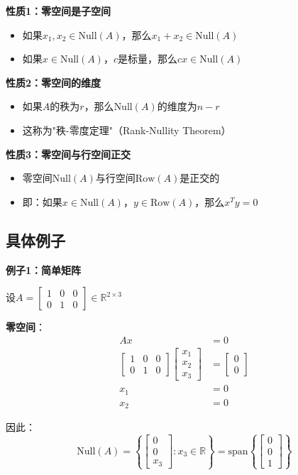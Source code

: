 \documentclass[12pt,a4paper]{article}
\begin{document}
\textbf{性质1：零空间是子空间}
\begin{itemize}
\item 如果$x_1, x_2 \in \text{Null}(A)$，那么$x_1 + x_2 \in \text{Null}(A)$
\item 如果$x \in \text{Null}(A)$，$c$是标量，那么$cx \in \text{Null}(A)$
\end{itemize}

\textbf{性质2：零空间的维度}
\begin{itemize}
\item 如果$A$的秩为$r$，那么$\text{Null}(A)$的维度为$n - r$
\item 这称为"秩-零度定理"（Rank-Nullity Theorem）
\end{itemize}

\textbf{性质3：零空间与行空间正交}
\begin{itemize}
\item 零空间$\text{Null}(A)$与行空间$\text{Row}(A)$是正交的
\item 即：如果$x \in \text{Null}(A)$，$y \in \text{Row}(A)$，那么$x^T y = 0$
\end{itemize}

\subsection{具体例子}

\textbf{例子1：简单矩阵}

设$A = \begin{bmatrix} 1 & 0 & 0 \\ 0 & 1 & 0 \end{bmatrix} \in \mathbb{R}^{2 \times 3}$

\textbf{零空间}：
\begin{align}
Ax &= 0 \\
\begin{bmatrix} 1 & 0 & 0 \\ 0 & 1 & 0 \end{bmatrix} \begin{bmatrix} x_1 \\ x_2 \\ x_3 \end{bmatrix} &= \begin{bmatrix} 0 \\ 0 \end{bmatrix} \\
x_1 &= 0 \\
x_2 &= 0
\end{align}

因此：
\begin{equation}
\text{Null}(A) = \left\{\begin{bmatrix} 0 \\ 0 \\ x_3 \end{bmatrix} : x_3 \in \mathbb{R}\right\} = \text{span}\left\{\begin{bmatrix} 0 \\ 0 \\ 1 \end{bmatrix}\right\}
\end{equation}
\end{document}
